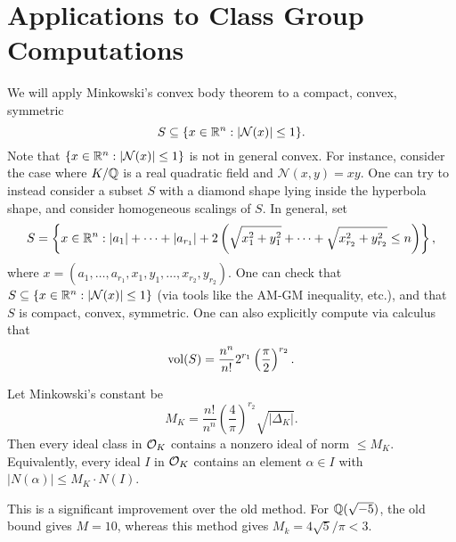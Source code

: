 \section{Applications to Class Group Computations}
\begin{remark}
  We will apply Minkowski's convex body theorem
  to a compact, convex, symmetric
  \[
    S \subseteq \{x \in \mathbb{R}^n : |\mathcal{N}(x)| \le 1\}.
  \]
  Note that $\{x \in \mathbb{R}^n : |\mathcal{N}(x)| \le 1\}$ is
  not in general convex. For instance, consider the case
  where $K / \mathbb{Q}$ is a real quadratic field and
  $\mathcal{N}(x, y) = xy$. One can try to instead
  consider a subset $S$ with a
  diamond shape lying inside the
  hyperbola shape, and consider homogeneous
  scalings of $S$. In general, set
  \[
    S = \left\{x \in \mathbb{R}^n : |a_1| + \dots + |a_{r_1}| + 2\left(\sqrt{x_1^2 + y_1^2} + \dots + \sqrt{x_{r_2}^2 + y_{r_2}^2} \le n\right)\right\},
  \]
  where $x = (a_1, \dots, a_{r_1}, x_1, y_1, \dots, x_{r_2}, y_{r_2})$.
  One can check that $S \subseteq \{x \in \mathbb{R}^n : |\mathcal{N}(x)| \le 1\}$
  (via tools like the AM-GM inequality, etc.), and
  that $S$ is compact, convex, symmetric.
  One can also explicitly compute via calculus that
  \[
    \operatorname{vol}(S) = \frac{n^n}{n!} 2^{r_1} \left(\frac{\pi}{2}\right)^{r_2}.
  \]
\end{remark}

\begin{corollary}
  Let Minkowski's constant be
  \[
    M_K = \frac{n!}{n^n} \left(\frac{4}{\pi}\right)^{r_2} \sqrt{|\Delta_K|}.
  \]
  Then every ideal class in $\mathcal{O}_K$ contains
  a nonzero ideal of norm $\le M_K$. Equivalently,
  every ideal $I$ in $\mathcal{O}_K$ contains an element
  $\alpha \in I$ with $|N(\alpha)| \le M_K \cdot N(I)$.
\end{corollary}

\begin{remark}
  This is a significant improvement over the old method.
  For $\mathbb{Q}(\sqrt{-5})$, the old bound gives
  $M = 10$, whereas this method gives
  $M_k = 4\sqrt{5} / \pi < 3$.
\end{remark}
